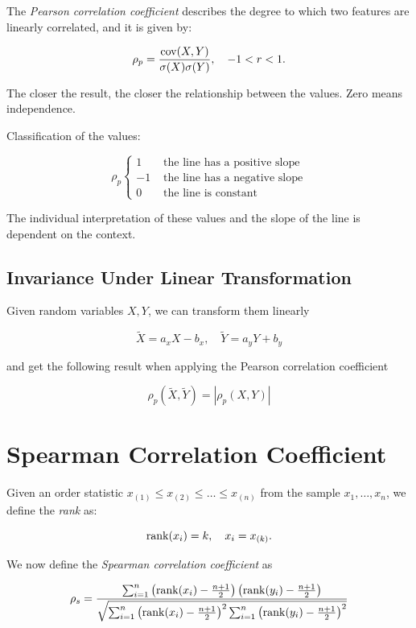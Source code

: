 The \emph{Pearson correlation coefficient} describes the degree to which two features are linearly correlated, and it is given by: 

\[
    \rho_p = \frac{\mathrm{cov}(X,Y)}{\sigma(X) \sigma(Y)}, \quad -1 < r < 1.
\]

The closer the result, the closer the relationship between the values. Zero means 
independence.

Classification of the values:

\[
    \rho_p
    \begin{cases}
    1 & \text{ the line has a positive slope} \\   
    -1 & \text{ the line has a negative slope} \\   
    0 & \text{ the line is constant}
    \end{cases}
\]

The individual interpretation of these values and the slope of the line is dependent on the context.

\subsection{Invariance Under Linear Transformation}

Given random variables \(X,Y\), we can transform them linearly 

\[
    \tilde{X} = a_x X - b_x, \quad \tilde{Y} = a_y Y + b_y
\]

and get the following result when applying the Pearson correlation coefficient

\[
    \rho_p (\tilde{X}, \tilde{Y}) = |\rho_p (X, Y)|
\]

\section{Spearman Correlation Coefficient}

Given an order statistic \(x_{(1)} \le x_{(2)} \le \dots \le x_{(n)}\) from the sample \(x_1, \dots, x_n\), we define the \emph{rank}  as:

\[
    \mathrm{rank}(x_i) = k, \quad x_i = x_{(k)}.
\]

We now define the \emph{Spearman correlation coefficient} as 

\[
    \rho_s = \frac{\sum_{i = 1}^{n} \left(\mathrm{rank}(x_i) - \frac{n + 1}{2}\right) \left(\mathrm{rank}(y_i) - \frac{n + 1}{2}\right)}{\sqrt{\sum_{i = 1}^{n} \left(\mathrm{rank}(x_i) - \frac{n + 1}{2}\right)^2 \sum_{i = 1}^n \left(\mathrm{rank}(y_i) - \frac{n + 1}{2}\right)^2}}
\]

